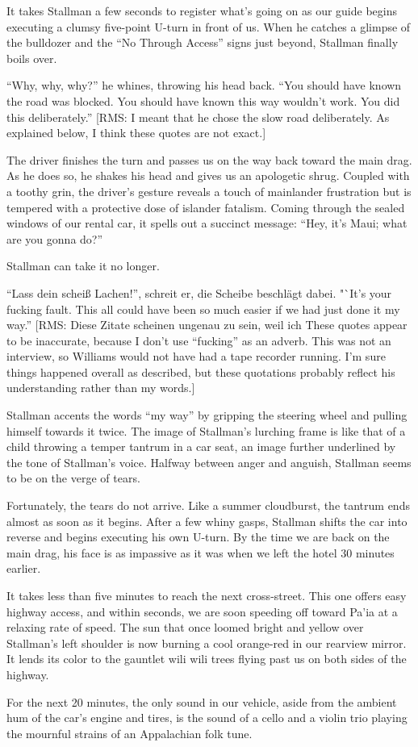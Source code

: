It takes Stallman a few seconds to register what's going on as our guide begins executing a clumsy five-point U-turn in front of us. When he catches a glimpse of the bulldozer and the ``No Through Access'' signs just beyond, Stallman finally boils over.

``Why, why, why?'' he whines, throwing his head back. ``You should have known the road was blocked. You should have known this way wouldn't work. You did this deliberately.''  [RMS: I meant that he chose the slow road deliberately.  As explained below, I think these quotes are not exact.]

The driver finishes the turn and passes us on the way back toward the main drag. As he does so, he shakes his head and gives us an apologetic shrug. Coupled with a toothy grin, the driver's gesture reveals a touch of mainlander frustration but is tempered with a protective dose of islander fatalism. Coming through the sealed windows of our rental car, it spells out a succinct message: ``Hey, it's Maui; what are you gonna do?''

Stallman can take it no longer.

"`Lass dein scheiß Lachen!"', schreit er, die Scheibe beschlägt dabei. "`It's your fucking fault. This all could have been so much easier if we had just done it my way.'' [RMS: Diese Zitate scheinen ungenau zu sein, weil ich These quotes appear to be inaccurate, because I don't use ``fucking'' as an adverb.  This was not an interview, so Williams would not have had a tape recorder running.  I'm sure things happened overall as described, but these quotations probably reflect his understanding rather than my words.]

Stallman accents the words ``my way'' by gripping the steering wheel and pulling himself towards it twice. The image of Stallman's lurching frame is like that of a child throwing a temper tantrum in a car seat, an image further underlined by the tone of Stallman's voice. Halfway between anger and anguish, Stallman seems to be on the verge of tears.

Fortunately, the tears do not arrive. Like a summer cloudburst, the tantrum ends almost as soon as it begins. After a few whiny gasps, Stallman shifts the car into reverse and begins executing his own U-turn. By the time we are back on the main drag, his face is as impassive as it was when we left the hotel 30 minutes earlier.

It takes less than five minutes to reach the next cross-street. This one offers easy highway access, and within seconds, we are soon speeding off toward Pa'ia at a relaxing rate of speed. The sun that once loomed bright and yellow over Stallman's left shoulder is now burning a cool orange-red in our rearview mirror. It lends its color to the gauntlet wili wili trees flying past us on both sides of the highway.

For the next 20 minutes, the only sound in our vehicle, aside from the ambient hum of the car's engine and tires, is the sound of a cello and a violin trio playing the mournful strains of an Appalachian folk tune.
